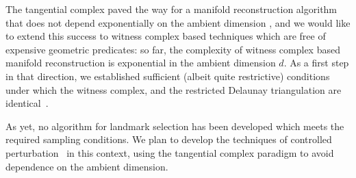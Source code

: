 %
The tangential complex paved the way for a manifold reconstruction
algorithm that does not depend exponentially on the ambient dimension
\cite{geometrica-7142i}, 
and we would like to extend this success to witness complex based
techniques which are free of expensive geometric predicates:
%
so far, the complexity of witness complex
based manifold reconstruction is exponential in the ambient dimension
$d$.
As a first step in that direction, we established sufficient (albeit
quite restrictive) conditions under which the witness complex, and the
restricted Delaunay triangulation are
identical~\cite{boissonnat2011cgl}.
%

As yet, no algorithm for landmark selection has been developed which
meets the required sampling conditions.  We plan to develop the
techniques of controlled perturbation~\cite{funke2005cp} in this
context, using the tangential complex paradigm to avoid dependence on
the ambient dimension.



